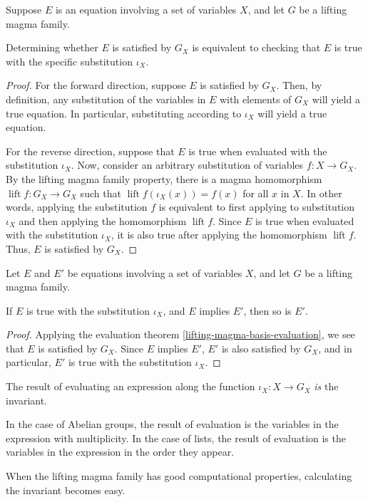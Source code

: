 \begin{theorem}\label{lifting-magma-basis-evaluation}
Suppose $E$ is an equation involving a set of variables $X$, and let $G$ be a lifting magma family.

Determining whether $E$ is satisfied by $G_X$ is equivalent to checking that $E$ is true with the specific substitution $\iota_X$.

\end{theorem}
\begin{proof}
For the forward direction, suppose $E$ is satisfied by $G_X$. Then, by definition, any substitution of the variables in $E$ with elements of $G_X$ will yield a true equation. In particular, substituting according to $\iota_X$ will yield a true equation.

For the reverse direction, suppose that $E$ is true when evaluated with the substitution $\iota_X$. Now, consider an arbitrary substitution of variables $f : X \to G_X$. By the lifting magma family property, there is a magma homomorphism $\operatorname{lift}{f} : G_X \to G_X$ such that $\operatorname{lift}{f}(\iota_X(x)) = f(x)$ for all $x$ in $X$. In other words, applying the substitution $f$ is equivalent to first applying to substitution $\iota_X$ and then applying the homomorphism $\operatorname{lift}{f}$. Since $E$ is true when evaluated with the substitution $\iota_X$, it is also true after applying the homomorphism $\operatorname{lift}{f}$. Thus, $E$ is satisfied by $G_X$.
\end{proof}

\begin{theorem}\label{fundamental-property-of-invariants}
Let $E$ and $E'$ be equations involving a set of variables $X$, and let $G$ be a lifting magma family.

If $E$ is true with the substitution $\iota_X$, and $E$ implies $E'$, then so is $E'$.
\end{theorem}
\begin{proof}
Applying the evaluation theorem \ref{lifting-magma-basis-evaluation}, we see that $E$ is satisfied by $G_X$. Since $E$ implies $E'$, $E'$ is also satisfied by $G_X$, and in particular, $E'$ is true with the substitution $\iota_X$.
\end{proof}

\begin{remark}
The result of evaluating an expression along the function $\iota_X : X \to G_X$ \emph{is} the invariant.

In the case of Abelian groups, the result of evaluation is the variables in the expression with multiplicity.
In the case of lists, the result of evaluation is the variables in the expression in the order they appear.

When the lifting magma family has good computational properties, calculating the invariant becomes easy.
\end{remark}


